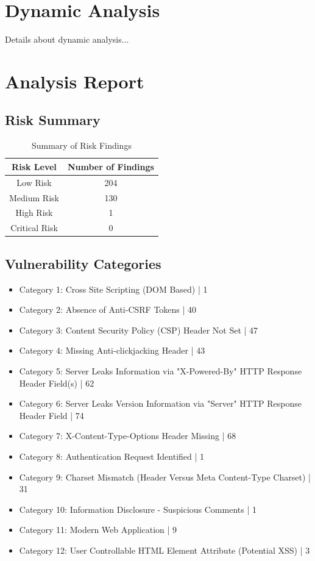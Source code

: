 \documentclass[12pt]{article}
\begin{document}
\newpage
\section{Dynamic Analysis}
Details about dynamic analysis...

\section{Analysis Report}

\subsection{Risk Summary}
\begin{table}[h!]
\centering
\renewcommand{\arraystretch}{1.5}
\begin{tabular}{|c|c|}
\hline
\textbf{Risk Level} & \textbf{Number of Findings} \\
\hline
Low Risk & 204 \\ 
\hline
Medium Risk & 130 \\ 
\hline
High Risk & 1 \\ 
\hline
Critical Risk & 0 \\ 
\hline
\end{tabular}
\caption{Summary of Risk Findings}
\label{tab:risk_summary}
\end{table}

\subsection{Vulnerability Categories}
\begin{itemize}
\item Category 1: Cross Site Scripting (DOM Based) | 1
\item Category 2: Absence of Anti-CSRF Tokens | 40
\item Category 3: Content Security Policy (CSP) Header Not Set | 47
\item Category 4: Missing Anti-clickjacking Header | 43
\item Category 5: Server Leaks Information via "X-Powered-By" HTTP Response Header Field(s) | 62
\item Category 6: Server Leaks Version Information via "Server" HTTP Response Header Field | 74
\item Category 7: X-Content-Type-Options Header Missing | 68
\item Category 8: Authentication Request Identified | 1
\item Category 9: Charset Mismatch (Header Versus Meta Content-Type Charset) | 31
\item Category 10: Information Disclosure - Suspicious Comments | 1
\item Category 11: Modern Web Application | 9
\item Category 12: User Controllable HTML Element Attribute (Potential XSS) | 3

\end{itemize}
\end{document}
